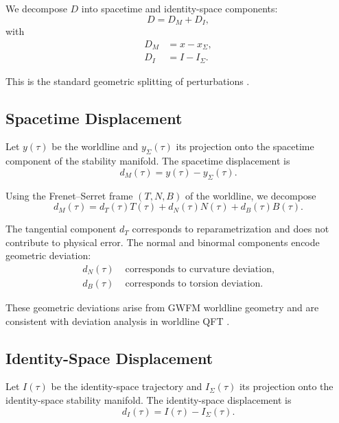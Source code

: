 \documentclass[aip,jmp,reprint,onecolumn,nofootinbib]{revtex4-2}
\begin{document}
We decompose $D$ into spacetime and identity-space components:
\begin{equation}
D = D_M + D_I,
\end{equation}
with
\begin{align}
D_M &= x - x_\Sigma, \\
D_I &= I - I_\Sigma.
\end{align}

This is the standard geometric splitting of perturbations \cite{doCarmo}.

\subsection{Spacetime Displacement}

Let $y(\tau)$ be the worldline and $y_\Sigma(\tau)$ its projection onto the spacetime 
component of the stability manifold. The spacetime displacement is
\begin{equation}
d_M(\tau) = y(\tau) - y_\Sigma(\tau).
\end{equation}

Using the Frenet--Serret frame $(T,N,B)$ of the worldline, we decompose
\begin{equation}
d_M(\tau)
=
d_T(\tau) T(\tau)
+
d_N(\tau) N(\tau)
+
d_B(\tau) B(\tau).
\end{equation}

The tangential component $d_T$ corresponds to reparametrization and does not contribute 
to physical error. The normal and binormal components encode geometric deviation:
\begin{align}
d_N(\tau) &\text{ corresponds to curvature deviation}, \\
d_B(\tau) &\text{ corresponds to torsion deviation}.
\end{align}

These geometric deviations arise from GWFM worldline geometry 
\cite{DuttonElectronField2026} and are consistent with deviation analysis in worldline QFT 
\cite{Polyakov1987,Schubert2001}.

\subsection{Identity-Space Displacement}

Let $I(\tau)$ be the identity-space trajectory and $I_\Sigma(\tau)$ its projection onto the 
identity-space stability manifold. The identity-space displacement is
\begin{equation}
d_I(\tau) = I(\tau) - I_\Sigma(\tau).
\end{equation}
\end{document}
